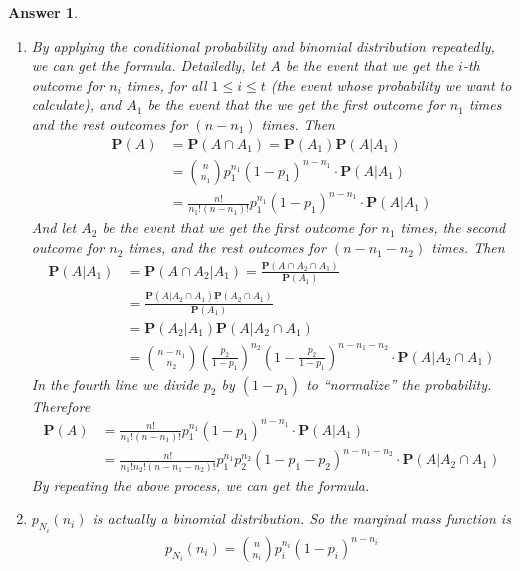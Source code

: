 \documentclass[utf8]{article}
\theoremstyle{definition}%
\theoremstyle{plain}%
\newtheorem{answer}{Answer} %
\begin{document}
\begin{answer} ~
    \begin{enumerate}[label=(\alph*)]
        \item By applying the conditional probability and binomial distribution repeatedly, we can get the formula. Detailedly, let $A$ be the event that we get the $i$-th outcome for $n_i$ times, for all $1 \leq i \leq t$ (the event whose probability we want to calculate), and $A_1$ be the event that the we get the first outcome for $n_1$ times and the rest outcomes for $(n - n_1)$ times. Then
        \begin{equation}
        \begin{aligned}
            \mathbf{P}(A) &= \mathbf{P}(A \cap A_1) = \mathbf{P}(A_1) \mathbf{P}(A | A_1) \\
            &= \binom{n}{n_1} p_1^{n_1} (1-p_1)^{n-n_1} \cdot \mathbf{P}(A | A_1) \\ 
            &= \frac{n!}{n_1!(n-n_1)!} p_1^{n_1} (1-p_1)^{n-n_1} \cdot \mathbf{P}(A | A_1)
        \end{aligned}
        \end{equation}
        And let $A_2$ be the event that we get the first outcome for $n_1$ times, the second outcome for $n_2$ times, and the rest outcomes for $(n - n_1 - n_2)$ times. Then
        \begin{equation}
        \begin{aligned}
            \mathbf{P}(A | A_1) &= \mathbf{P}(A \cap A_2 | A_1) = \frac{\mathbf{P}(A \cap A_2 \cap A_1)}{\mathbf{P}(A_1)} \\ 
            &= \frac{\mathbf{P}(A | A_2 \cap A_1) \mathbf{P}(A_2 \cap A_1)}{\mathbf{P}(A_1)} \\ 
            &= \mathbf{P}(A_2 | A_1) \mathbf{P}(A | A_2 \cap A_1) \\ 
            &= \binom{n-n_1}{n_2} \left(\frac{p_2}{1 - p_1}\right)^{n_2} \left(1 - \frac{p_2}{1 - p_1}\right)^{n-n_1-n_2} \cdot \mathbf{P}(A | A_2 \cap A_1)
        \end{aligned}
        \end{equation}
        In the fourth line we divide $p_2$ by $(1 - p_1)$ to ``normalize'' the probability. Therefore
        \begin{equation}
        \begin{aligned}
            \mathbf{P}(A) &= \frac{n!}{n_1!(n-n_1)!} p_1^{n_1} (1-p_1)^{n-n_1} \cdot \mathbf{P}(A | A_1) \\ 
            &= \frac{n!}{n_1!n_2!(n-n_1-n_2)!} p_1^{n_1} p_2^{n_2} (1-p_1-p_2)^{n-n_1-n_2} \cdot \mathbf{P}(A | A_2 \cap A_1)
        \end{aligned}
        \end{equation}
        By repeating the above process, we can get the formula. 
        \item $p_{N_i}(n_i)$ is actually a binomial distribution. So the marginal mass function is
        \begin{align}
            p_{N_i}(n_i) = \binom{n}{n_i} p_i^{n_i} (1-p_i)^{n-n_i}
        \end{align}
    \end{enumerate}
    
\end{answer}
\end{document}
